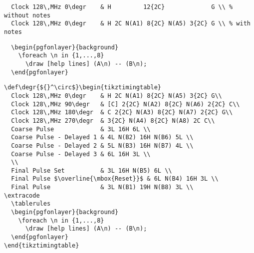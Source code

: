 \begin{verbatim}
  Clock 128\,MHz 0\degr    & H         12{2C}             G \\ % without notes
  Clock 128\,MHz 0\degr    & H 2C N(A1) 8{2C} N(A5) 3{2C} G \\ % with    notes
\end{verbatim}



\begin{verbatim}
  \begin{pgfonlayer}{background}
    \foreach \n in {1,...,8}
      \draw [help lines] (A\n) -- (B\n);
  \end{pgfonlayer}
\end{verbatim}



\begin{verbatim}
\def\degr{${}^\circ$}\begin{tikztimingtable}
  Clock 128\,MHz 0\degr    & H 2C N(A1) 8{2C} N(A5) 3{2C} G\\
  Clock 128\,MHz 90\degr   & [C] 2{2C} N(A2) 8{2C} N(A6) 2{2C} C\\
  Clock 128\,MHz 180\degr  & C 2{2C} N(A3) 8{2C} N(A7) 2{2C} G\\
  Clock 128\,MHz 270\degr  & 3{2C} N(A4) 8{2C} N(A8) 2C C\\
  Coarse Pulse             & 3L 16H 6L \\
  Coarse Pulse - Delayed 1 & 4L N(B2) 16H N(B6) 5L \\
  Coarse Pulse - Delayed 2 & 5L N(B3) 16H N(B7) 4L \\
  Coarse Pulse - Delayed 3 & 6L 16H 3L \\
  \\
  Final Pulse Set          & 3L 16H N(B5) 6L \\
  Final Pulse $\overline{\mbox{Reset}}$ & 6L N(B4) 16H 3L \\
  Final Pulse              & 3L N(B1) 19H N(B8) 3L \\
\extracode
  \tablerules
  \begin{pgfonlayer}{background}
    \foreach \n in {1,...,8}
      \draw [help lines] (A\n) -- (B\n);
  \end{pgfonlayer}
\end{tikztimingtable}
\end{verbatim}


